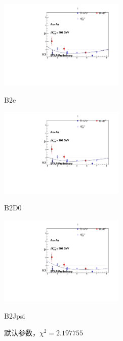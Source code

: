\documentclass{ctexart}
\newcommand\blankpage{%
    \null
    \thispagestyle{empty}%
    \addtocounter{page}{-1}%
    \newpage}
\begin{document}
\begin{figure}[h]
\centering
\begin{minipage}[t]{0.48\textwidth}
\centering
\includegraphics[width=6cm]{src/run125/graph/B2e.pdf}
\caption{B2e}
\end{minipage}
\begin{minipage}[t]{0.48\textwidth}
\centering
\includegraphics[width=6cm]{src/run125/graph/B2D0.pdf}
\caption{B2D0}
\end{minipage}
\begin{minipage}[t]{0.48\textwidth}
\centering
\includegraphics[width=6cm]{src/run125/graph/B2Jpsi.pdf}
\caption{B2Jpsi}
\end{minipage}
\label{B2}
\caption{默认参数，$\chi^2=\num{2.197755}$}
\end{figure}


\afterpage{\blankpage}


\end{document}
